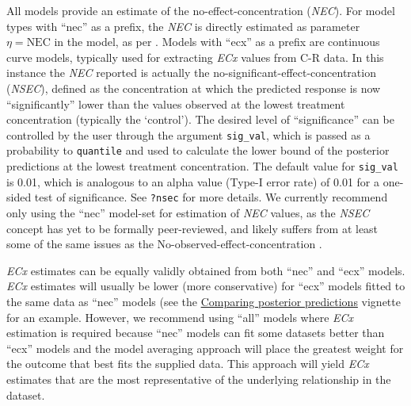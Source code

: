 \documentclass[
]{jss}
\begin{document}
All models provide an estimate of the no-effect-concentration
(\emph{NEC}). For model types with ``nec'' as a prefix, the \emph{NEC}
is directly estimated as parameter \(\eta = \text{NEC}\) in the model,
as per \citet{Fox2010}. Models with ``ecx'' as a prefix are continuous
curve models, typically used for extracting \emph{ECx} values from C-R
data. In this instance the \emph{NEC} reported is actually the
no-significant-effect-concentration (\emph{NSEC}), defined as the
concentration at which the predicted response is now ``significantly''
lower than the values observed at the lowest treatment concentration
(typically the `control'). The desired level of ``significance'' can be
controlled by the user through the argument \texttt{sig\_val}, which is
passed as a probability to \texttt{quantile} and used to calculate the
lower bound of the posterior predictions at the lowest treatment
concentration. The default value for \texttt{sig\_val} is 0.01, which is
analogous to an alpha value (Type-I error rate) of 0.01 for a one-sided
test of significance. See \texttt{?nsec} for more details. We currently
recommend only using the ``nec'' model-set for estimation of \emph{NEC}
values, as the \emph{NSEC} concept has yet to be formally peer-reviewed,
and likely suffers from at least some of the same issues as the
No-observed-effect-concentration
\citep[\emph{NOEC},][]{Warne2008a, Fox2008}.

\emph{ECx} estimates can be equally validly obtained from both ``nec''
and ``ecx'' models. \emph{ECx} estimates will usually be lower (more
conservative) for ``ecx'' models fitted to the same data as ``nec''
models (see the
\href{https://open-aims.github.io/bayesnec/articles/example4.html}{Comparing
posterior predictions} vignette for an example. However, we recommend
using ``all'' models where \emph{ECx} estimation is required because
``nec'' models can fit some datasets better than ``ecx'' models and the
model averaging approach will place the greatest weight for the outcome
that best fits the supplied data. This approach will yield \emph{ECx}
estimates that are the most representative of the underlying
relationship in the dataset.
\end{document}
